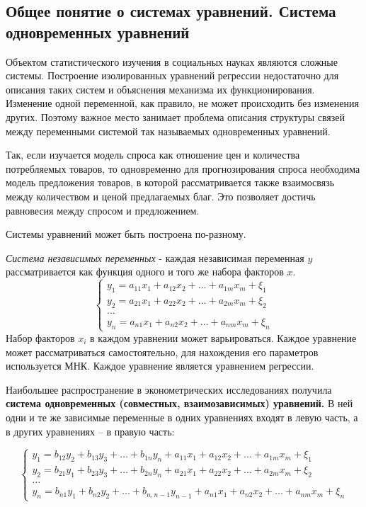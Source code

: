 \documentclass[aps,%
12pt,%
final,%
oneside,
onecolumn,%
musixtex, %
superscriptaddress,%
centertags]{article} %
\theoremstyle{plain}
\theoremstyle{definition}
\theoremstyle{remark}
\begin{document}
\subsection{Общее понятие о системах уравнений. Система одновременных уравнений}

Объектом статистического изучения в социальных науках являются сложные системы. Построение изолированных уравнений
регрессии недостаточно для описания таких систем и объяснения механизма их функционирования. Изменение одной переменной, как правило, не может происходить без изменения других. Поэтому важное место занимает проблема описания структуры связей между переменными системой так называемых одновременных уравнений.

Так, если изучается модель спроса как отношение цен и количества потребляемых товаров, то одновременно для прогнозирования спроса необходима модель предложения товаров, в которой рассматривается также взаимосвязь между количеством и ценой предлагаемых благ. Это позволяет достичь равновесия между спросом и предложением.

Системы уравнений может быть построена по-разному.

\textit{Система независимых переменных} - каждая независимая переменная $y$ рассматривается как функция одного и того же набора факторов $x$.
$$\left \{
\begin{matrix}
	y_1 = a_{11}x_1 + a_{12}x_2 + \ldots + a_{1m}x_m + \xi_1 \\[0.3cm]
	y_2 =a_{21}x_1 + a_{22}x_2 + \ldots + a_{2m}x_m + \xi_2  \\[0.3cm]
	\ldots \\
	y_n = a_{n1}x_1 + a_{n2}x_2 + \ldots + a_{nm}x_m + \xi_n 
\end{matrix}
\right.
$$
Набор факторов $x_i$ в каждом уравнении может варьироваться. Каждое уравнение может рассматриваться самостоятельно, для нахождения его параметров используется МНК. Каждое уравнение является уравнением регрессии.

Наибольшее распространение в эконометрических исследованиях получила \textbf{система одновременных (совместных, взаимозависимых) уравнений.} В ней одни и те же зависимые переменные в одних уравнениях входят в левую часть, а в других уравнениях – в правую часть:

$$\left \{
\begin{matrix}
	y_1 = b_{12}y_2 + b_{13}y_3 + \ldots + b_{1n}y_n +  a_{11}x_1 + a_{12}x_2 + \ldots + a_{1m}x_m + \xi_1 \\[0.3cm]
	y_2 =b_{21}y_1 + b_{23}y_3 + \ldots + b_{2n}y_n + a_{21}x_1 + a_{22}x_2 + \ldots + a_{2m}x_m + \xi_2  \\[0.3cm]
	\ldots \\
	y_n = b_{n1}y_1 + b_{n2}y_2 + \ldots + b_{n,n-1}y_{n-1} + a_{n1}x_1 + a_{n2}x_2 + \ldots + a_{nm}x_m + \xi_n 
\end{matrix}
\right.
$$
\end{document}
